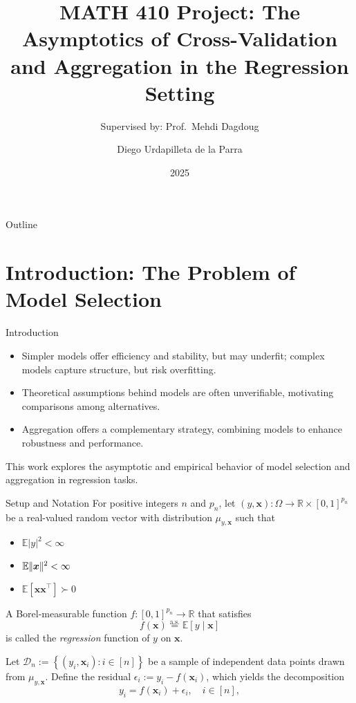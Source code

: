 \documentclass{beamer}
\title[CV for Selection and Aggregation]{MATH 410 Project: The Asymptotics of Cross-Validation and Aggregation in the Regression Setting}
\author[Diego Urdapilleta]{Diego Urdapilleta de la Parra}
\subtitle{Supervised by: Prof.\ Mehdi Dagdoug}
\institute[McGill]{McGill University}
\date{2025}
\newcommand{\R}{\mathbb{R}}
\newcommand{\0}{\emptyset}
\newcommand{\E}{\mathbb{E}}
\newcommand{\Ep}[1]{\mathbb{E}\left[ #1 \right]}
\newcommand{\paren}[1]{\left(#1 \right)}
\newcommand{\set}[1]{\left\{ #1 \right\}}
\newcommand{\norm}[1]{|\hspace{-1pt}|#1 |\hspace{-1pt}|}
\newcommand{\normsq}[1]{\norm{#1}^{2}}
\newcommand{\data}{\mathcal{D}_{n}}
\newcommand{\aseq}{\stackrel{\mathrm{a.s.}}{=}}
\newcommand{\x}{\boldsymbol{x}}
\newcommand{\1}{\mathmybb{1}}
\begin{document}
\begin{frame}
  \titlepage{}
\end{frame}

\begin{frame}{Outline}
  \tableofcontents
\end{frame}

\section{Introduction: The Problem of Model Selection}
\begin{frame}{Introduction}
  \begin{itemize}
    \item<1-> Simpler models offer efficiency and stability, but may underfit; complex models capture structure, but risk overfitting.

    \item<2-> Theoretical assumptions behind models are often unverifiable, motivating comparisons among alternatives.

    \item<3-> Aggregation offers a complementary strategy, combining models to enhance robustness and performance.
  \end{itemize}

  This work explores the asymptotic and empirical behavior of model selection and aggregation in regression tasks.
\end{frame}

\begin{frame}{Setup and Notation}
  For positive integers $n$ and $p_{n}$, let $(y, \x):\Omega\to\R\times{[0,1]}^{p_{n}}$ be a real-valued random vector with distribution $\mu_{y, \x}$ such that 
  \begin{itemize}
    \item $\E{|y|^{2}}<\infty$
    \item $\E\normsq{\x}<\infty$
    \item $\Ep{\x\x^{\top}}\succ 0$
  \end{itemize}

  A Borel-measurable function \(f:{[0,1]}^{p_{n}} \to \R\) that satisfies
  \[f(\x) \aseq \Ep{y\mid \x}\]
  is called the \emph{regression} function of \(y\) on \(\x\). 
  
  Let \(\data := \set{\paren{y_{i}, \x_{i}}:i\in [n]}\) be a sample of independent data points drawn from \(\mu_{y, \x}\).
  Define the residual \(\epsilon_{i}:= y_{i} - f(\x_{i})\), which yields the decomposition
  \[y_{i} = f(\x_{i}) + \epsilon_{i}, \quad i\in[n],\]
\end{frame}
\end{document}
